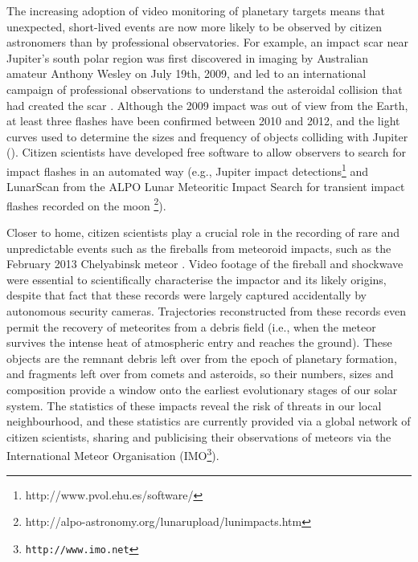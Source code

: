 \documentclass{ar2e}
\begin{document}
The increasing adoption of video monitoring of planetary targets means that
unexpected, short-lived events are now more likely to be observed by citizen
astronomers than by professional observatories.  For example, an impact scar
near Jupiter's south polar region was first discovered in imaging by Australian
amateur Anthony Wesley on July 19th, 2009, and led to an international campaign
of professional observations to understand the asteroidal collision that had
created the scar \citep[e.g.,][]{10hammel,10depater,11orton}.  Although the 2009
impact was out of view from the Earth, at least three flashes have been
confirmed between 2010 and 2012, and the light curves used to determine the
sizes and frequency of objects colliding with Jupiter \citep[e.g.,][]{10hueso}
().  Citizen scientists have developed free software
to allow observers to search for impact flashes in an automated way (e.g.,
Jupiter impact detections\footnote{http://www.pvol.ehu.es/software/} and
LunarScan from the ALPO Lunar Meteoritic Impact Search for transient impact
flashes recorded on the moon
\footnote{http://alpo-astronomy.org/lunarupload/lunimpacts.htm}).  


Closer to home, citizen scientists play a crucial role in the recording of rare
and unpredictable events such as the fireballs from meteoroid impacts, such as
the February 2013 Chelyabinsk meteor \citep{13popova}.  Video footage of the
fireball and shockwave were essential to scientifically characterise the
impactor and its likely origins, despite that fact that these records were
largely captured accidentally by autonomous security cameras.  Trajectories
reconstructed from these records even permit the recovery of meteorites from a
debris field (i.e., when the meteor survives the intense heat of atmospheric
entry and reaches the ground).  These objects are the remnant debris left over
from the epoch of planetary formation, and fragments left over from comets and
asteroids, so their numbers, sizes and composition provide a window onto the
earliest evolutionary stages of our solar system.  The statistics of these
impacts reveal the risk of threats in our local neighbourhood, and these
statistics are currently provided via a global network of citizen scientists,
sharing and publicising their observations of meteors via the International
Meteor Organisation (IMO\footnote{\texttt{http://www.imo.net}}).
\end{document}
